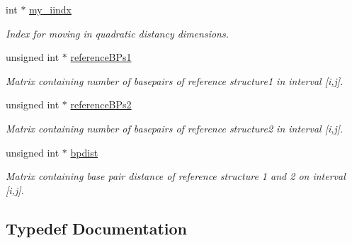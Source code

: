 \begin{DoxyCompactItemize}
int $\ast$ \hyperlink{group__kl__neighborhood__mfe_a1a20cb06b58b75d1a3dbdbc8bc60d0a7}{my\+\_\+iindx}
\begin{DoxyCompactList}\small\item\em Index for moving in quadratic distancy dimensions. \end{DoxyCompactList}\item 
\mbox{\label{group__kl__neighborhood__mfe_a536525b98c1b633d4c5f2da4f8d78c18}} 
unsigned int $\ast$ \hyperlink{group__kl__neighborhood__mfe_a536525b98c1b633d4c5f2da4f8d78c18}{reference\+B\+Ps1}
\begin{DoxyCompactList}\small\item\em Matrix containing number of basepairs of reference structure1 in interval \mbox{[}i,j\mbox{]}. \end{DoxyCompactList}\item 
\mbox{\label{group__kl__neighborhood__mfe_aa7abf73c3114cb5f0dc90e702fa9dd0f}} 
unsigned int $\ast$ \hyperlink{group__kl__neighborhood__mfe_aa7abf73c3114cb5f0dc90e702fa9dd0f}{reference\+B\+Ps2}
\begin{DoxyCompactList}\small\item\em Matrix containing number of basepairs of reference structure2 in interval \mbox{[}i,j\mbox{]}. \end{DoxyCompactList}\item 
\mbox{\label{group__kl__neighborhood__mfe_af1106e1a592e2dccc92b3452340549e0}} 
unsigned int $\ast$ \hyperlink{group__kl__neighborhood__mfe_af1106e1a592e2dccc92b3452340549e0}{bpdist}
\begin{DoxyCompactList}\small\item\em Matrix containing base pair distance of reference structure 1 and 2 on interval \mbox{[}i,j\mbox{]}. \end{DoxyCompactList}\end{DoxyCompactItemize}


\subsection{Typedef Documentation}
\mbox{\label{group__kl__neighborhood__mfe_ga6a81a58268d250309712549a3fa0aab2}} 
